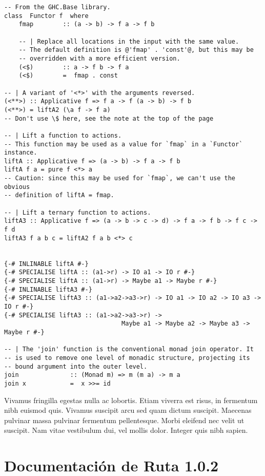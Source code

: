 \documentclass[oneside,openright,titlepage,numbers=noenddot,openany,headinclude,footinclude=true,
cleardoublepage=empty,abstractoff,BCOR=5mm,paper=a4,fontsize=12pt,main=spanish]{scrreprt}
\begin{document}
\begin{verbatim}
-- From the GHC.Base library.
class  Functor f  where
    fmap        :: (a -> b) -> f a -> f b

    -- | Replace all locations in the input with the same value.
    -- The default definition is @'fmap' . 'const'@, but this may be
    -- overridden with a more efficient version.
    (<$)        :: a -> f b -> f a
    (<$)        =  fmap . const

-- | A variant of '<*>' with the arguments reversed.
(<**>) :: Applicative f => f a -> f (a -> b) -> f b
(<**>) = liftA2 (\a f -> f a)
-- Don't use \$ here, see the note at the top of the page

-- | Lift a function to actions.
-- This function may be used as a value for `fmap` in a `Functor` instance.
liftA :: Applicative f => (a -> b) -> f a -> f b
liftA f a = pure f <*> a
-- Caution: since this may be used for `fmap`, we can't use the obvious
-- definition of liftA = fmap.

-- | Lift a ternary function to actions.
liftA3 :: Applicative f => (a -> b -> c -> d) -> f a -> f b -> f c -> f d
liftA3 f a b c = liftA2 f a b <*> c


{-# INLINABLE liftA #-}
{-# SPECIALISE liftA :: (a1->r) -> IO a1 -> IO r #-}
{-# SPECIALISE liftA :: (a1->r) -> Maybe a1 -> Maybe r #-}
{-# INLINABLE liftA3 #-}
{-# SPECIALISE liftA3 :: (a1->a2->a3->r) -> IO a1 -> IO a2 -> IO a3 -> IO r #-}
{-# SPECIALISE liftA3 :: (a1->a2->a3->r) ->
                                Maybe a1 -> Maybe a2 -> Maybe a3 -> Maybe r #-}

-- | The 'join' function is the conventional monad join operator. It
-- is used to remove one level of monadic structure, projecting its
-- bound argument into the outer level.
join              :: (Monad m) => m (m a) -> m a
join x            =  x >>= id
\end{verbatim}

Vivamus fringilla egestas nulla ac lobortis. Etiam viverra est risus,
in fermentum nibh euismod quis. Vivamus suscipit arcu sed quam dictum
suscipit. Maecenas pulvinar massa pulvinar fermentum
pellentesque. Morbi eleifend nec velit ut suscipit. Nam vitae
vestibulum dui, vel mollis dolor. Integer quis nibh sapien.

\appendix

\section{Documentación de Ruta 1.0.2}

%



   
\end{document}
